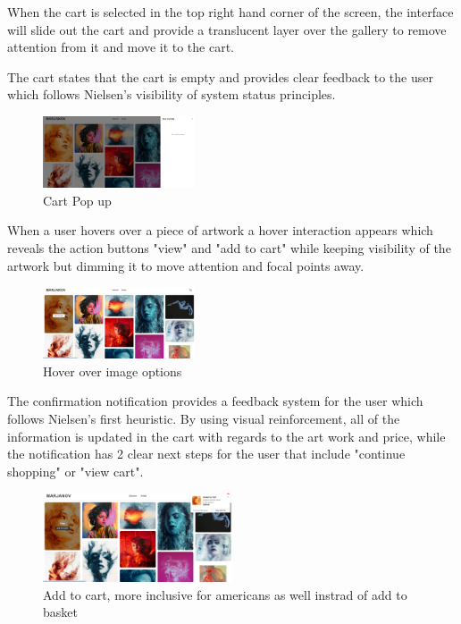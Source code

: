 \documentclass[]{project_final}
\begin{document}
When the cart is selected in the top right hand corner of the screen, the interface will slide out the cart and provide a translucent layer over the gallery to remove attention from it and move it to the cart.

The cart states that the cart is empty and provides clear feedback to the user which follows Nielsen's visibility of system status principles.

\begin{figure}[ht!]
    \centering
    \includegraphics[width=0.4\textwidth]{AG2.png}
    \vspace*{0.0cm}
    \caption{Cart Pop up}
    \label{fig:1}
\end{figure}

When a user hovers over a piece of artwork a hover interaction appears which reveals the action buttons "view" and "add to cart" while keeping visibility of the artwork but dimming it to move attention and focal points away.

\begin{figure}[ht!]
    \centering
    \includegraphics[width=0.4\textwidth]{AG3.png}
    \vspace*{0.0cm}
    \caption{Hover over image options}
    \label{fig:1}
\end{figure}

The confirmation notification provides a feedback system for the user which follows Nielsen's first heuristic. By using visual reinforcement, all of the information is updated in the cart  with regards to the art work and price, while the notification has 2 clear next steps for the user that include "continue shopping" or "view cart".

\begin{figure}[ht!]
    \centering
    \includegraphics[width=0.5\textwidth]{AG4.png}
    \vspace*{0.0cm}
    \caption{Add to cart, more inclusive for americans as well instrad of add to basket}
    \label{fig:1}
\end{figure}
\end{document}
